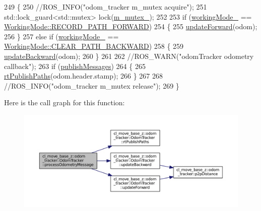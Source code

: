\begin{DoxyCode}
249 \{
250     \textcolor{comment}{//ROS\_INFO("odom\_tracker m\_mutex acquire");}
251     std::lock\_guard<std::mutex> lock(\hyperlink{classcl__move__base__z_1_1odom__tracker_1_1OdomTracker_aa371639e1eee269273dec8d3ab9dba0f}{m\_mutex\_});
252 
253     \textcolor{keywordflow}{if} (\hyperlink{classcl__move__base__z_1_1odom__tracker_1_1OdomTracker_a5ae598c85c4469f4c0e984480575c42b}{workingMode\_} == \hyperlink{namespacecl__move__base__z_1_1odom__tracker_ac46b05813b2791604f6cd0a39ace3ef8a989d06a586bcf9520889228da7faa643}{WorkingMode::RECORD\_PATH\_FORWARD})
254     \{
255         \hyperlink{classcl__move__base__z_1_1odom__tracker_1_1OdomTracker_aa63ebddd9f6e42b0330738af82b60f99}{updateForward}(odom);
256     \}
257     \textcolor{keywordflow}{else} \textcolor{keywordflow}{if} (\hyperlink{classcl__move__base__z_1_1odom__tracker_1_1OdomTracker_a5ae598c85c4469f4c0e984480575c42b}{workingMode\_} == \hyperlink{namespacecl__move__base__z_1_1odom__tracker_ac46b05813b2791604f6cd0a39ace3ef8a0cf8f27617189e35619df3c18bda6274}{WorkingMode::CLEAR\_PATH\_BACKWARD})
258     \{
259         \hyperlink{classcl__move__base__z_1_1odom__tracker_1_1OdomTracker_a35c8d8d9ae82244ef351ba0a6a4a7cfd}{updateBackward}(odom);
260     \}
261 
262     \textcolor{comment}{//ROS\_WARN("odomTracker odometry callback");}
263     \textcolor{keywordflow}{if} (\hyperlink{classcl__move__base__z_1_1odom__tracker_1_1OdomTracker_a4f253d45ab5750dee3c2f18dd5599725}{publishMessages})
264     \{
265         \hyperlink{classcl__move__base__z_1_1odom__tracker_1_1OdomTracker_a8f728f85d1f3f49f4b94e37052a59d6d}{rtPublishPaths}(odom.header.stamp);
266     \}
267 
268     \textcolor{comment}{//ROS\_INFO("odom\_tracker m\_mutex release");}
269 \}
\end{DoxyCode}


Here is the call graph for this function\+:
\nopagebreak
\begin{figure}[H]
\begin{center}
\leavevmode
\includegraphics[width=350pt]{classcl__move__base__z_1_1odom__tracker_1_1OdomTracker_a12c5a839cfde2e8f2f55a5e0c9647b18_cgraph}
\end{center}
\end{figure}




